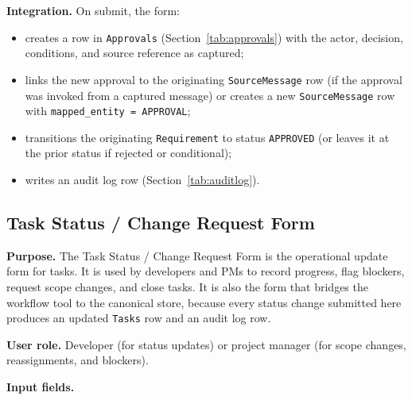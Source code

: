 \documentclass[12pt,a4paper]{report}
\begin{document}
\textbf{Integration.} On submit, the form:
\begin{itemize}[leftmargin=1.6em]
    \item creates a row in \texttt{Approvals} (Section~\ref{tab:approvals})
          with the actor, decision, conditions, and source reference as
          captured;
    \item links the new approval to the originating
          \texttt{SourceMessage} row (if the approval was invoked from a
          captured message) or creates a new \texttt{SourceMessage} row with
          \texttt{mapped\_entity = APPROVAL};
    \item transitions the originating \texttt{Requirement} to status
          \texttt{APPROVED} (or leaves it at the prior status if rejected or
          conditional);
    \item writes an audit log row (Section~\ref{tab:auditlog}).
\end{itemize}

\subsection{Task Status / Change Request Form}
\label{sec:form-task}

\textbf{Purpose.} The Task Status / Change Request Form is the operational
update form for tasks. It is used by developers and PMs to record progress,
flag blockers, request scope changes, and close tasks. It is also the form
that bridges the workflow tool to the canonical store, because every status
change submitted here produces an updated \texttt{Tasks} row and an audit
log row.

\textbf{User role.} Developer (for status updates) or project manager (for
scope changes, reassignments, and blockers).

\textbf{Input fields.}
\end{document}
